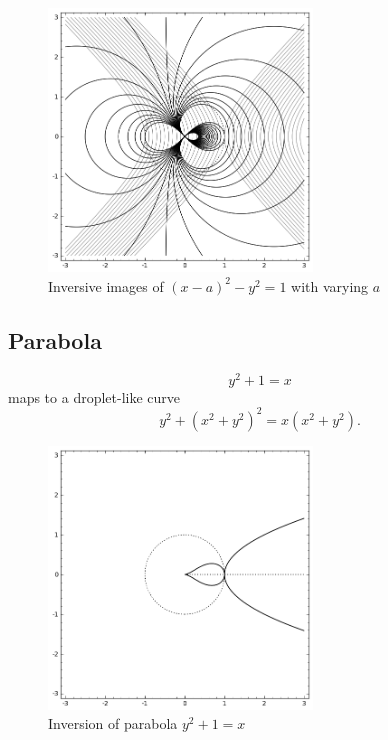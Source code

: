 \documentclass{article}
\begin{document}
\begin{figure}[htb]
\centering
\includegraphics[width=70mm]{./images/hyperbola_locus.png}
\caption{\label{fig:}Inversive images of $(x-a)^2 -y^2 = 1$ with varying $a$}
\end{figure}

\subsection{Parabola}
\label{sec-2-2}

\begin{equation}
\label{ }
y^2 + 1 = x
\end{equation}
maps to a droplet-like curve
\begin{equation}
\label{ }
y^2 + (x^2 + y^2)^2 = x(x^2 + y^2).
\end{equation}

\begin{figure}[htb]
\centering
\includegraphics[width=70mm]{./images/para_drop.png}
\caption{\label{fig:para-drop}Inversion of parabola $y^2+1=x$}
\end{figure}
\end{document}
